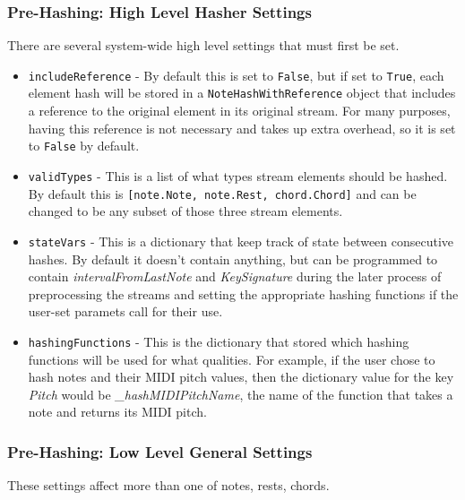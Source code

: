 \subsubsection{Pre-Hashing: High Level Hasher Settings}
There are several system-wide high level settings that must first be set.
\begin{itemize}
\item \texttt{includeReference} - By default this is set to \texttt{False}, but if set to \texttt{True}, each element hash will be stored in a \texttt{NoteHashWithReference} object that includes a reference to the original element in its original stream. For many purposes, having this reference is not necessary and takes up extra overhead, so it is set to \texttt{False} by default.

\item \texttt{validTypes} - This is a list of what types stream elements should be hashed. By default this is \texttt{[note.Note, note.Rest, chord.Chord]} and can be changed to be any subset of those three stream elements.
\item \texttt{stateVars} - This is a dictionary that keep track of state between consecutive hashes. By default it doesn't contain anything, but can be programmed to contain \textit{intervalFromLastNote} and \textit{KeySignature} during the later process of preprocessing the streams and setting the appropriate hashing functions if the user-set paramets call for their use. 

\item \texttt{hashingFunctions} - This is the dictionary that stored which hashing functions will be used for what qualities. For example, if the user chose to hash notes and their MIDI pitch values, then the dictionary value for the key \textit{Pitch} would be \textit{\_hashMIDIPitchName}, the name of the function that takes a note and returns its MIDI pitch. 
\end{itemize}

        \subsubsection{Pre-Hashing: Low Level General Settings}
        These settings affect more than one of notes, rests, chords.
        

